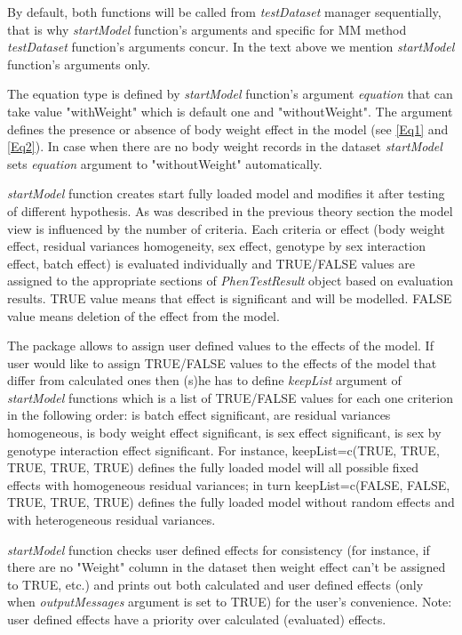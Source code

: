 \documentclass[12pt,a4paper]{article}
\begin{document}
By default, both functions will be called from \textit{testDataset} manager sequentially, that is why \textit{startModel} function's arguments and specific for MM method \textit{testDataset} function's arguments concur.
In the text above we mention \textit{startModel} function's arguments only. 

The equation type is defined by \textit{startModel} function's argument \textit{equation} that can take value "withWeight" which is default one and "withoutWeight". The argument defines the presence or absence of body weight effect in the model (see \ref{Eq1} and \ref{Eq2}). 
In case when there are no body weight records in the dataset \textit{startModel} sets \textit{equation} argument to "withoutWeight" automatically.

\textit{startModel} function creates start fully loaded model and modifies it after testing of different hypothesis. 
As was described in the previous theory section the model view is influenced by the number of criteria. 
Each criteria or effect (body weight effect, residual variances homogeneity, sex effect, genotype by sex interaction effect, batch effect) is evaluated individually
and TRUE/FALSE values are assigned to the appropriate sections of \textit{PhenTestResult} object based on evaluation results. 
TRUE value means that effect is significant and will be modelled. FALSE value means deletion of the effect from the model.

The package allows to assign user defined values to the effects of the model. 
If user would like to assign TRUE/FALSE values to the effects of the model that differ from calculated ones then (s)he has to define \textit{keepList} argument of \textit{startModel} functions 
which is a list of TRUE/FALSE values for each one criterion in the following order: is batch effect significant, are residual variances homogeneous, is body weight effect significant, 
is sex effect significant, is sex by genotype interaction effect significant. 
For instance, keepList=c(TRUE, TRUE, TRUE, TRUE, TRUE) defines the fully loaded model will all possible fixed effects with homogeneous residual variances; 
in turn keepList=c(FALSE, FALSE, TRUE, TRUE, TRUE) defines the fully loaded model without random effects and with heterogeneous residual variances.

\textit{startModel} function checks user defined effects for consistency (for instance, if there are no "Weight" column in the dataset then weight effect can't be assigned to TRUE, etc.)
and prints out both calculated and user defined effects (only when \textit{outputMessages} argument is set to TRUE) for the user's convenience. Note: user defined effects have a priority over calculated (evaluated) effects.
\end{document}
